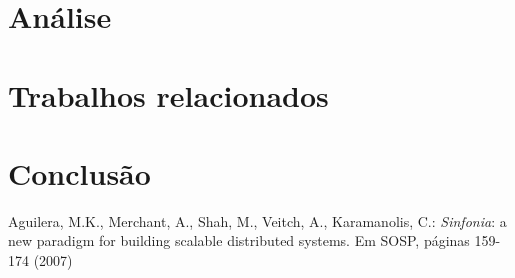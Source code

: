 \documentclass[a4paper,11pt]{report}
\begin{document}
\chapter{Análise}
\chapter{Trabalhos relacionados}
\chapter{Conclusão}

\begin{thebibliography}{99}

 Aguilera, M.K., Merchant, A., Shah, M., Veitch, A., Karamanolis, C.: \emph{Sinfonia}: a new paradigm for building scalable distributed systems. Em SOSP, páginas 159-174 (2007)

\end{thebibliography}
\end{document}
